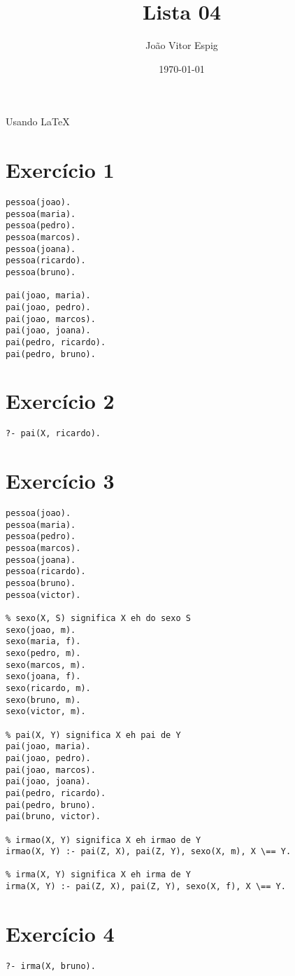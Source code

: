 \documentclass[12pt,a4paper,brazil]{article}
\title{Lista 04}
\author{João Vitor Espig}
\date{\today}
\begin{document}
\maketitle
Usando \LaTeX

\section*{Exercício 1}
\begin{lstlisting}
pessoa(joao).
pessoa(maria).
pessoa(pedro).
pessoa(marcos).
pessoa(joana).
pessoa(ricardo).
pessoa(bruno).

pai(joao, maria).
pai(joao, pedro).
pai(joao, marcos).
pai(joao, joana).
pai(pedro, ricardo).
pai(pedro, bruno).
\end{lstlisting}

\section*{Exercício 2}
\begin{lstlisting}
?- pai(X, ricardo).
\end{lstlisting}

\section*{Exercício 3}
\begin{lstlisting}
pessoa(joao).
pessoa(maria).
pessoa(pedro).
pessoa(marcos).
pessoa(joana).
pessoa(ricardo).
pessoa(bruno).
pessoa(victor).

% sexo(X, S) significa X eh do sexo S
sexo(joao, m).
sexo(maria, f).
sexo(pedro, m).
sexo(marcos, m).
sexo(joana, f).
sexo(ricardo, m).
sexo(bruno, m).
sexo(victor, m).

% pai(X, Y) significa X eh pai de Y
pai(joao, maria).
pai(joao, pedro).
pai(joao, marcos).
pai(joao, joana).
pai(pedro, ricardo).
pai(pedro, bruno).
pai(bruno, victor).

% irmao(X, Y) significa X eh irmao de Y
irmao(X, Y) :- pai(Z, X), pai(Z, Y), sexo(X, m), X \== Y.

% irma(X, Y) significa X eh irma de Y
irma(X, Y) :- pai(Z, X), pai(Z, Y), sexo(X, f), X \== Y.
\end{lstlisting}

\section*{Exercício 4}
\begin{lstlisting}
?- irma(X, bruno).
\end{lstlisting}
\end{document}
